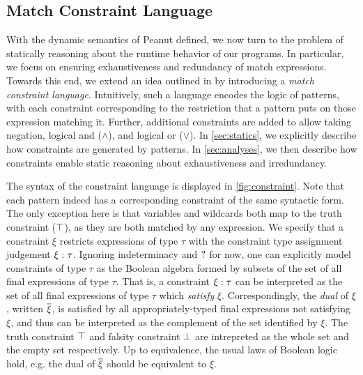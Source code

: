 \subsection{Match Constraint Language}\label{sec:constraints}
With the dynamic semantics of Peanut defined, we now turn to the problem of statically reasoning about the runtime behavior of our programs. In particular, we focus on ensuring exhaustiveness and redundancy of match expressions. Towards this end, we extend an idea outlined in \cite{Harper2012} by introducing a \emph{match constraint language}. Intuitively, such a language encodes the logic of patterns, with each constraint corresponding to the restriction that a pattern puts on those expression matching it. Further, additional constraints are added to allow taking negation, logical and ($\land$), and logical or ($\lor$). In \autoref{sec:statics}, we explicitly describe how constraints are generated by patterns. In \autoref{sec:analyses}, we then describe how constraints enable static reasoning about exhaustiveness and irredundancy.



The syntax of the constraint language is displayed in \autoref{fig:constraint}. Note that each pattern indeed has a corresponding constraint of the same syntactic form. The only exception here is that variables and wildcards both map to the truth constraint ($\top$), as they are both matched by any expression. We specify that a constraint $\xi$ restricts expressions of type $\tau$ with the constraint type assignment judgement $\xi : \tau$. Ignoring indeterminacy and $\mathtt{?}$ for now, one can explicitly model constraints of type $\tau$ as the Boolean algebra formed by subsets of the set of all final expressions of type $\tau$. That is, a constraint $\xi : \tau$ can be interpreted as the set of all final expressions of type $\tau$ which \emph{satisfy} $\xi$. Correspondingly, the \emph{dual} of $\xi$ , written $\overline{\xi}$, is satisfied by all appropriately-typed final expressions not satisfying $\xi$, and thus can be interpreted as the complement of the set identified by $\xi$. The truth constraint $\top$ and falsity constraint $\bot$ are intrepreted as the whole set and the empty set respectively. Up to equivalence, the usual laws of Boolean logic hold, e.g. the dual of $\overline{\xi}$ should be equivalent to $\xi$.



